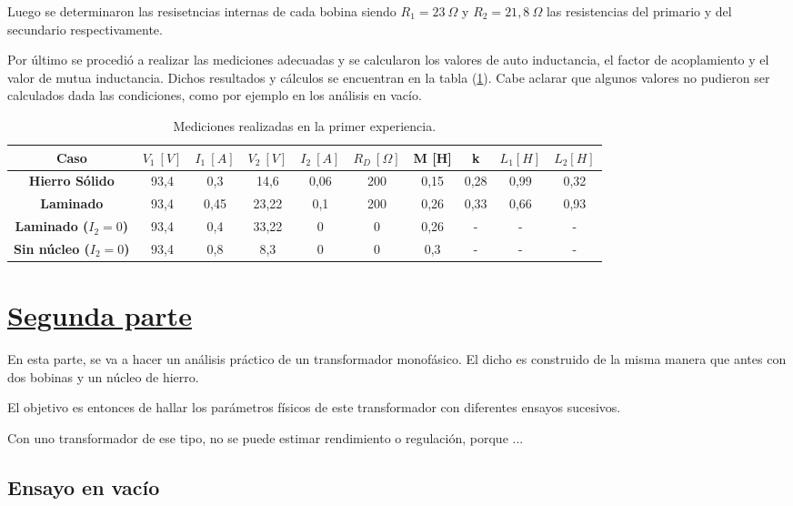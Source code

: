 \documentclass[a4paper]{article}
\begin{document}
Luego se determinaron las resisetncias internas de cada bobina siendo $ R_1 = 23 \ \Omega $ y $ R_2 = 21,8 \ \Omega $ las resistencias del primario y del secundario respectivamente.

Por último se procedió a realizar las mediciones adecuadas y se calcularon los valores de auto inductancia, el factor de acoplamiento y el valor de mutua inductancia. Dichos resultados y cálculos se encuentran en la tabla (\ref{tabla:1a}). Cabe aclarar que algunos valores no pudieron ser calculados dada las condiciones, como por ejemplo en los análisis en vacío. 

\begin{table}[H]
\begin{tabular}{|c|c|c|c|c|c|c|c|c|c|}
\hline
\textbf{Caso} & $V_1 \ [V]$ & $I_1 \ [A]$ & $V_2 \ [V]$ & $I_2 \ [A]$ & $R_D \ [\Omega]$ & M [H]& k & $L_1 [H]$ & $L_2 [H]$ \\ \hline
\textbf{Hierro Sólido} & 93,4 & 0,3 & 14,6 & 0,06 & 200 & 0,15 & 0,28 & 0,99 & 0,32 \\ \hline
\textbf{Laminado} & 93,4 & 0,45 & 23,22 & 0,1 & 200 & 0,26 & 0,33 & 0,66 & 0,93 \\ \hline
\textbf{Laminado ($I_2 = 0$)} & 93,4 & 0,4 & 33,22 & 0 & 0 & 0,26 & - & - & - \\ \hline
\textbf{Sin núcleo ($I_2 = 0$)} & 93,4 & 0,8 & 8,3 & 0 & 0 & 0,3 & - & - & - \\ \hline
\end{tabular}
\caption{Mediciones realizadas en la primer experiencia.}
\label{tabla:1a}
\end{table}

\section{\underline{Segunda parte}}

En esta parte, se va a hacer un análisis práctico de un transformador monofásico. El dicho es construido de la misma manera que antes con dos bobinas y un núcleo de hierro.

El objetivo es entonces de hallar los parámetros físicos de este transformador con diferentes ensayos sucesivos.

Con uno transformador de ese tipo, no se puede estimar rendimiento o regulación, porque ...

\subsection{Ensayo en vacío}
\end{document}
